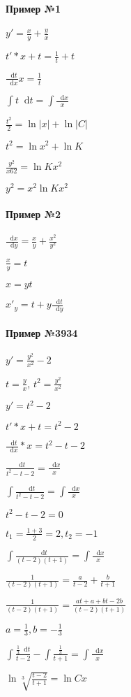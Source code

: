 \documentclass{article}
\newcommand*\diff{\mathop{}\!\mathrm{d}}
\begin{document}
\begin{minipage}{0.49\textwidth}
\paragraph{Пример №1} $y' = \frac{x}{y} + \frac{y}{x}$

$t' * x + t = \frac{1}{t} + t$

$\frac{\diff t}{\diff x} x = \frac{1}{t}$

$\int t \diff t = \int \frac{\diff x}{x}$

$\frac{t^2}{2} = \ln |x| + \ln |C|$

$t^2 = \ln x^2 + \ln K$

$\frac{y^2}{x62} = \ln K x^2$

$y^2 = x^2 \ln K x^2$
\paragraph{Пример №2} $\frac{\diff x}{\diff y} = \frac{x}{y} + \frac{x^2}{y^2}$

$\frac{x}{y} = t$

$x = yt$

$x'_y = t + y \frac{\diff t}{\diff y}$
\end{minipage}
\begin{minipage}{0.49\textwidth}
    \paragraph{Пример №3934}
    $y' = \frac{y^2}{x^2} - 2$
    
    $t = \frac{y}{x}$, $t^2 = \frac{y^2}{x^2}$
    
    $y' = t^2 - 2$
    
    $t' * x + t = t^2 - 2$
    
    $\frac{\diff t}{\diff x} * x = t^2 - t - 2$
    
    $\frac{\diff t}{t^2 - t - 2} = \frac{\diff x}{x}$
    
    $\int \frac{\diff t}{t^2 - t - 2} = \int \frac{\diff x}{x}$
    
    $t^2 - t - 2 = 0$
    
    $t_1 = \frac{1 + 3}{2} = 2, t_2 = -1$
    
    $\int \frac{\diff t}{(t - 2)(t + 1)} = \int \frac{\diff x}{x}$

    $\frac{1}{(t - 2)(t + 1)} = \frac{a}{t - 2} + \frac{b}{t + 1}$

    $\frac{1}{(t - 2)(t + 1)} = \frac{a t + a + bt - 2b}{(t - 2)(t + 1)}$

    $a = \frac{1}{3}, b = -\frac{1}{3}$

    $\int \frac{\frac{1}{3} \diff t}{t - 2} - \int \frac{\frac{1}{3}}{t + 1} = \int \frac{\diff x}{x}$

    $\ln \sqrt[3]{\frac{t - 2}{t + 1}} = \ln C x$
\end{minipage}
\end{document}
